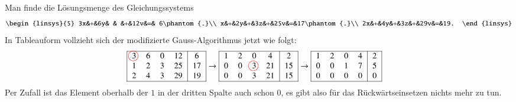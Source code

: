 \begin{beispiel}
Man finde die Lösungsmenge des Gleichungssystems
\[
\begin{linsys}{5}
3x&+&6y& &  &+&12v&=& 6\phantom{.}\\
 x&+&2y&+&3z&+&25v&=&17\phantom{.}\\
2x&+&4y&+&3z&+&29v&=&19.
\end{linsys}
\]
In Tableauform vollzieht sich der modifizierte Gauss-Algorithmus jetzt wie
folgt:
\begin{align*}
\begin{tabular}{| >{$}c<{$} >{$}c<{$} >{$}c<{$} >{$}c<{$} | >{$}c<{$} |}
\hline
  3
\begin{picture}(0,0)
\color{red}\put(-3.5,3){\circle{12}}
\end{picture}
   &  6&  0& 12&  6\\
  1&  2&  3& 25& 17\\
  2&  4&  3& 29& 19\\
\hline
\end{tabular}
&\rightarrow
\begin{tabular}{| >{$}c<{$} >{$}c<{$} >{$}c<{$} >{$}c<{$} | >{$}c<{$} |}
\hline
  1&  2&  0&  4&  2\\
  0&  0&  3
\begin{picture}(0,0)
\color{red}\put(-3.5,3){\circle{12}}
\end{picture}
           & 21& 15\\
  0&  0&  3& 21& 15\\
\hline
\end{tabular}
\rightarrow
\begin{tabular}{| >{$}c<{$} >{$}c<{$} >{$}c<{$} >{$}c<{$} | >{$}c<{$} |}
\hline
  1&  2&  0&  4&  2\\
  0&  0&  1&  7&  5\\
  0&  0&  0&  0&  0\\
\hline
\end{tabular}
\end{align*}
Per Zufall ist das Element oberhalb der $1$ in der dritten Spalte auch schon $0$,
es gibt also für das Rückwärtseinsetzen nichts mehr zu tun.


\end{beispiel}
